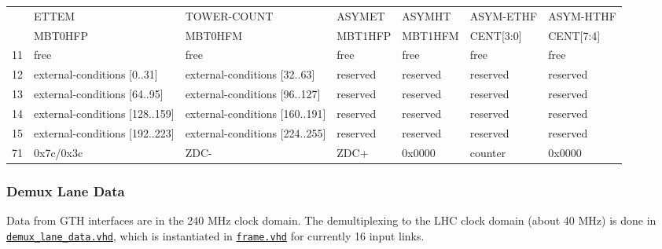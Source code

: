 \begin{table}
\begin{tabular}{c|m{}|m{}|m{}|m{}|m{}|m{}|}
\multicolumn{1}{|c|}{} &
\multicolumn{1}{l|}{ETTEM} & TOWER-COUNT & ASYMET & ASYMHT & ASYM-ETHF & ASYM-HTHF \\
\multicolumn{1}{|c|}{} &
\multicolumn{1}{l|}{MBT0HFP} & MBT0HFM & MBT1HFP & MBT1HFM & CENT[3:0] & CENT[7:4] \\\hline
\multicolumn{1}{|c|}{11} & free & free & free & free & free & free \\\hline
\multicolumn{1}{|c|}{12} & external-conditions [0..31] & external-conditions [32..63] & reserved & reserved & reserved & reserved \\\hline
\multicolumn{1}{|c|}{13} & external-conditions [64..95] & external-conditions [96..127] & reserved & reserved & reserved & reserved \\\hline
\multicolumn{1}{|c|}{14} & external-conditions [128..159] & external-conditions [160..191] & reserved & reserved & reserved & reserved \\\hline
\multicolumn{1}{|c|}{15} & external-conditions [192..223] & external-conditions [224..255] & reserved & reserved & reserved & reserved \\\hline
\multicolumn{1}{|c|}{71} & 0x7c/0x3c & ZDC- & ZDC+ & 0x0000 & counter & 0x0000 \\\hline
\end{tabular}
\label{tab:framework:tab_configuration_optical_conn}
\end{table}

\clearpage

%
%

\subsubsection{Demux Lane Data} \label{sec:framework:demux_lane_data}
Data from GTH interfaces are in the 240 MHz clock domain. The demultiplexing to the LHC clock domain (about 40 MHz) is done in \href{\gitbranch/firmware/hdl/payload/frame/demux_lane_data.vhd}{\texttt{\textquotesingle demux\_lane\_data.vhd\textquotesingle }}, which is instantiated in \href{\gitbranch/firmware/hdl/payload/frame.vhd}{\texttt{\textquotesingle frame.vhd\textquotesingle }} for currently 16 input links.

%
%

